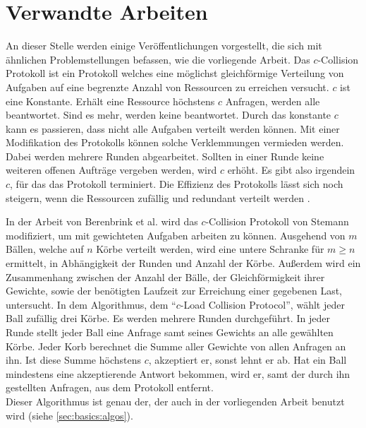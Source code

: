 \chapter{Verwandte Arbeiten}
\label{chap:relwork}
An dieser Stelle werden einige Veröffentlichungen vorgestellt, die sich mit ähnlichen Problemstellungen befassen, wie die vorliegende Arbeit.
%
Das $c$-Collision Protokoll \cite{ccol3} ist ein Protokoll welches eine möglichst gleichförmige Verteilung von Aufgaben auf eine begrenzte Anzahl von Ressourcen zu erreichen versucht. $c$ ist eine Konstante. Erhält eine Ressource höchstens $c$ Anfragen, werden alle beantwortet. Sind es mehr, werden keine beantwortet. Durch das konstante $c$ kann es passieren, dass nicht alle Aufgaben verteilt werden können. Mit einer Modifikation des Protokolls können solche Verklemmungen vermieden werden. Dabei werden mehrere Runden abgearbeitet. Sollten in einer Runde keine weiteren offenen Aufträge vergeben werden, wird $c$ erhöht. Es gibt also irgendein $c$, für das das Protokoll terminiert. Die Effizienz des Protokolls lässt sich noch steigern, wenn die Ressourcen zufällig und redundant verteilt werden \cite{ccol4}.

In der Arbeit von Berenbrink et al. \cite{ccol2} wird das $c$-Collision Protokoll von Stemann \cite{ccol3} modifiziert, um mit gewichteten Aufgaben arbeiten zu können. Ausgehend von $m$ Bällen, welche auf $n$ Körbe verteilt werden, wird eine untere Schranke für $m \ge n$ ermittelt, in Abhängigkeit der Runden und Anzahl der Körbe. Außerdem wird ein Zusammenhang zwischen der Anzahl der Bälle, der Gleichförmigkeit ihrer Gewichte, sowie der benötigten Laufzeit zur Erreichung einer gegebenen Last, untersucht. In dem Algorithmus, dem "`$c$-Load Collision Protocol"', wählt jeder Ball zufällig drei Körbe. Es werden mehrere Runden durchgeführt. In jeder Runde stellt jeder Ball eine Anfrage samt seines Gewichts an alle gewählten Körbe. Jeder Korb berechnet die Summe aller Gewichte von allen Anfragen an ihn. Ist diese Summe höchstens $c$, akzeptiert er, sonst lehnt er ab. Hat ein Ball mindestens eine akzeptierende Antwort bekommen, wird er, samt der durch ihn gestellten Anfragen, aus dem Protokoll entfernt.\\
Dieser Algorithmus ist genau der, der auch in der vorliegenden Arbeit benutzt wird (siehe \ref{sec:basics:algos}).
